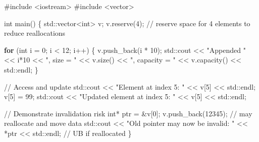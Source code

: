 \documentclass[
  letterpaper,
  DIV=11,
  numbers=noendperiod]{scrreprt}
\newenvironment{Shaded}{\begin{snugshade}}{\end{snugshade}}
\newcommand{\BuiltInTok}[1]{\textcolor[rgb]{0.00,0.23,0.31}{#1}}
\newcommand{\CommentTok}[1]{\textcolor[rgb]{0.37,0.37,0.37}{#1}}
\newcommand{\ControlFlowTok}[1]{\textcolor[rgb]{0.00,0.23,0.31}{\textbf{#1}}}
\newcommand{\DataTypeTok}[1]{\textcolor[rgb]{0.68,0.00,0.00}{#1}}
\newcommand{\DecValTok}[1]{\textcolor[rgb]{0.68,0.00,0.00}{#1}}
\newcommand{\ImportTok}[1]{\textcolor[rgb]{0.00,0.46,0.62}{#1}}
\newcommand{\NormalTok}[1]{\textcolor[rgb]{0.00,0.23,0.31}{#1}}
\newcommand{\OperatorTok}[1]{\textcolor[rgb]{0.37,0.37,0.37}{#1}}
\newcommand{\PreprocessorTok}[1]{\textcolor[rgb]{0.68,0.00,0.00}{#1}}
\newcommand{\StringTok}[1]{\textcolor[rgb]{0.13,0.47,0.30}{#1}}
\begin{document}
\begin{Shaded}
\begin{Highlighting}[]
\PreprocessorTok{\#include }\ImportTok{\textless{}iostream\textgreater{}}
\PreprocessorTok{\#include }\ImportTok{\textless{}vector\textgreater{}}

\DataTypeTok{int}\NormalTok{ main}\OperatorTok{()} \OperatorTok{\{}
    \BuiltInTok{std::}\NormalTok{vector}\OperatorTok{\textless{}}\DataTypeTok{int}\OperatorTok{\textgreater{}}\NormalTok{ v}\OperatorTok{;}
\NormalTok{    v}\OperatorTok{.}\NormalTok{reserve}\OperatorTok{(}\DecValTok{4}\OperatorTok{);}  \CommentTok{// reserve space for 4 elements to reduce reallocations}

    \ControlFlowTok{for} \OperatorTok{(}\DataTypeTok{int}\NormalTok{ i }\OperatorTok{=} \DecValTok{0}\OperatorTok{;}\NormalTok{ i }\OperatorTok{\textless{}} \DecValTok{12}\OperatorTok{;}\NormalTok{ i}\OperatorTok{++)} \OperatorTok{\{}
\NormalTok{        v}\OperatorTok{.}\NormalTok{push\_back}\OperatorTok{(}\NormalTok{i }\OperatorTok{*} \DecValTok{10}\OperatorTok{);}
        \BuiltInTok{std::}\NormalTok{cout }\OperatorTok{\textless{}\textless{}} \StringTok{"Appended "} \OperatorTok{\textless{}\textless{}}\NormalTok{ i}\OperatorTok{*}\DecValTok{10}
                  \OperatorTok{\textless{}\textless{}} \StringTok{", size = "} \OperatorTok{\textless{}\textless{}}\NormalTok{ v}\OperatorTok{.}\NormalTok{size}\OperatorTok{()}
                  \OperatorTok{\textless{}\textless{}} \StringTok{", capacity = "} \OperatorTok{\textless{}\textless{}}\NormalTok{ v}\OperatorTok{.}\NormalTok{capacity}\OperatorTok{()} \OperatorTok{\textless{}\textless{}} \BuiltInTok{std::}\NormalTok{endl}\OperatorTok{;}
    \OperatorTok{\}}

    \CommentTok{// Access and update}
    \BuiltInTok{std::}\NormalTok{cout }\OperatorTok{\textless{}\textless{}} \StringTok{"Element at index 5: "} \OperatorTok{\textless{}\textless{}}\NormalTok{ v}\OperatorTok{[}\DecValTok{5}\OperatorTok{]} \OperatorTok{\textless{}\textless{}} \BuiltInTok{std::}\NormalTok{endl}\OperatorTok{;}
\NormalTok{    v}\OperatorTok{[}\DecValTok{5}\OperatorTok{]} \OperatorTok{=} \DecValTok{99}\OperatorTok{;}
    \BuiltInTok{std::}\NormalTok{cout }\OperatorTok{\textless{}\textless{}} \StringTok{"Updated element at index 5: "} \OperatorTok{\textless{}\textless{}}\NormalTok{ v}\OperatorTok{[}\DecValTok{5}\OperatorTok{]} \OperatorTok{\textless{}\textless{}} \BuiltInTok{std::}\NormalTok{endl}\OperatorTok{;}

    \CommentTok{// Demonstrate invalidation risk}
    \DataTypeTok{int}\OperatorTok{*}\NormalTok{ ptr }\OperatorTok{=} \OperatorTok{\&}\NormalTok{v}\OperatorTok{[}\DecValTok{0}\OperatorTok{];}
\NormalTok{    v}\OperatorTok{.}\NormalTok{push\_back}\OperatorTok{(}\DecValTok{12345}\OperatorTok{);} \CommentTok{// may reallocate and move data}
    \BuiltInTok{std::}\NormalTok{cout }\OperatorTok{\textless{}\textless{}} \StringTok{"Old pointer may now be invalid: "} \OperatorTok{\textless{}\textless{}} \OperatorTok{*}\NormalTok{ptr }\OperatorTok{\textless{}\textless{}} \BuiltInTok{std::}\NormalTok{endl}\OperatorTok{;} \CommentTok{// UB if reallocated}
\OperatorTok{\}}
\end{Highlighting}
\end{Shaded}
\end{document}
